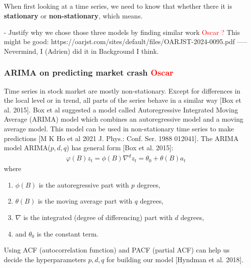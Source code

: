\documentclass[12pt, letterpaper]{article}
\begin{document}





\subparagraph*{}
When first looking at a time series, we need to know that whether there it is \textbf{stationary} or \textbf{non-stationary}, which means.

- Justify why we chose those three models by finding similar work \textcolor{red}{Oscar ?} This might be good: https://oarjst.com/sites/default/files/OARJST-2024-0095.pdf ----- Nevermind, I (Adrien) did it in Background I think.
    \subsubsection*{ARIMA on predicting market crash \textcolor{red}{Oscar}}
    Time series in stock market are mostly non-stationary. Except for differences in the local level or in trend, all parts of the series behave in a similar way [Box et al. 2015]. Box et al suggested a model called Autoregressive Integrated Moving Average (ARIMA) model which combines an autoregressive model and a moving average model. This model can be used in non-stationary time series to make predictions [M K Ho et al 2021 J. Phys.: Conf. Ser. 1988 012041].
    The ARIMA model ARIMA($p,d,q$) has general form [Box et al. 2015]:
    \begin{align*}
        \varphi (B) z_t = \phi (B)\nabla^d z_t = \theta_0 + \theta (B)a_t
    \end{align*}
    where
    \begin{enumerate}[label=\arabic*.]
        \item $\phi(B)$ is the autoregressive part with $p$ degrees,
        \item $\theta (B)$ is the moving average part with $q$ degrees,
        \item $\nabla$ is the integrated (degree of differencing) part with $d$ degrees,
        \item and $\theta_0$ is the constant term.
    \end{enumerate}
    Using ACF (autocorrelation function) and PACF (partial ACF) can help us decide the hyperparameters $p, d, q$ for building our model [Hyndman et al. 2018].
\end{document}
